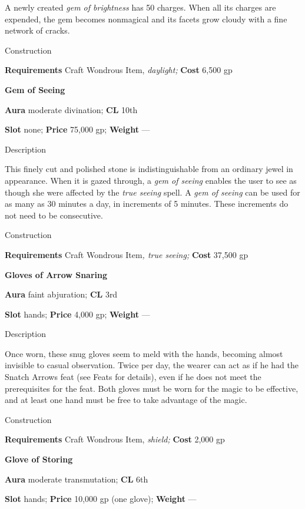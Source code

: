 A newly created \textit{gem of brightness} has 50 charges. When all its charges are expended, the gem becomes nonmagical and its facets grow cloudy with a fine network of cracks. 
				
Construction
				
\textbf{Requirements} Craft Wondrous Item,\textit{ daylight;}\textbf{ Cost }6,500 gp
				
\textbf{Gem of Seeing}
				
\textbf{Aura} moderate divination;\textbf{ CL }10th
				
\textbf{Slot} none; \textbf{Price} 75,000 gp; \textbf{Weight }---
				
Description
				
This finely cut and polished stone is indistinguishable from an ordinary jewel in appearance. When it is gazed through, a \textit{gem of seeing} enables the user to see as though she were affected by the \textit{true seeing} spell. A \textit{gem of seeing} can be used for as many as 30 minutes a day, in increments of 5 minutes. These increments do not need to be consecutive.
				
Construction
				
\textbf{Requirements} Craft Wondrous Item\textit{, true seeing;}\textbf{ Cost }37,500 gp
				
\textbf{Gloves of Arrow Snaring}
				
\textbf{Aura} faint abjuration; \textbf{CL} 3rd
				
\textbf{Slot} hands; \textbf{Price} 4,000 gp; \textbf{Weight }---
				
Description
				
Once worn, these snug gloves seem to meld with the hands, becoming almost invisible to casual observation. Twice per day, the wearer can act as if he had the Snatch Arrows feat (see Feats for details), even if he does not meet the prerequisites for the feat. Both gloves must be worn for the magic to be effective, and at least one hand must be free to take advantage of the magic. 
				
Construction
				
\textbf{Requirements} Craft Wondrous Item,\textit{ shield;}\textbf{ Cost }2,000 gp
				
\textbf{Glove of Storing}
				
\textbf{Aura} moderate transmutation;\textbf{ CL }6th
				
\textbf{Slot} hands; \textbf{Price} 10,000 gp (one glove); \textbf{Weight }---
				
